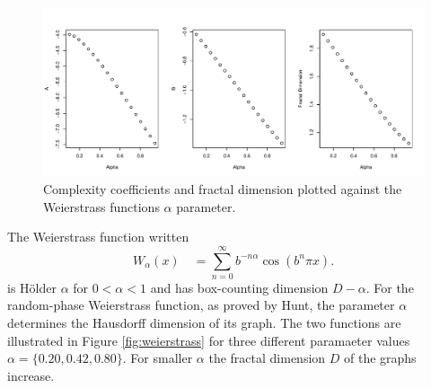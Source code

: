 \begin{figure}[!htbp]
  \begin{center}
  \includegraphics[width = \textwidth, keepaspectratio]{./figs/holder_notrandom-param-plots-notrandom}
  \end{center} 
  \caption{Complexity coefficients and fractal dimension 
  plotted against the Weierstrass functions $\alpha$ parameter.  }
  \label{fig:notrandom-params}
\end{figure}



The  Weierstrass function written
\[
  W_{\alpha}(x) 
  \hspace{1em}= \sum_{n = 0}^{\infty} b^{-n \alpha} \cos(b^n \pi x).
\]
is H\"older $\alpha$ for $0 < \alpha < 1$ and has box-counting dimension $D-\alpha$.  
For the random-phase Weierstrass function, as proved by Hunt\cite{hunt1998}, 
the parameter $\alpha$ determines the Hausdorff dimension of its graph. 
The two functions are illustrated in Figure \ref{fig:weierstrass} 
for three different paramaeter values $
\alpha = \{ 0.20, 0.42, 0.80 \}$. 
For smaller $\alpha$ the fractal dimension $D$ of the 
graphs increase.

